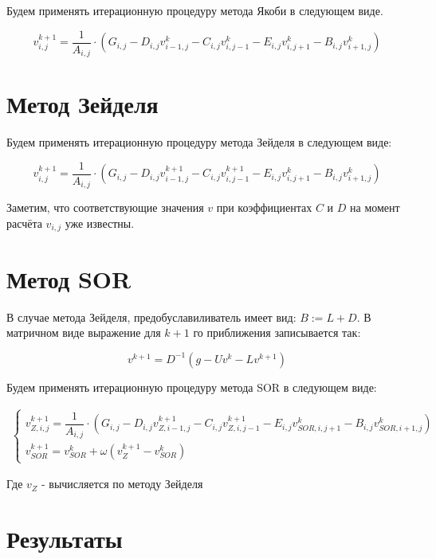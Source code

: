 \documentclass[12pt]{article}
\begin{document}
Будем применять итерационную процедуру метода Якоби в следующем виде.

\begin{equation}
v_{i,j}^{k+1} = \dfrac{1}{A_{i,j}} \cdot (G_{i,j} - D_{i,j}v_{i-1,j}^{k} - C_{i,j}v_{i,j-1}^{k} - E_{i,j}v_{i,j+1}^{k} - B_{i,j}v_{i+1,j}^{k})
\end{equation}

\section{Метод Зейделя}

Будем применять итерационную процедуру метода Зейделя в следующем виде:

\begin{equation}
v_{i,j}^{k+1} = \dfrac{1}{A_{i,j}} \cdot (G_{i,j} - D_{i,j}v_{i-1,j}^{k+1} - C_{i,j}v_{i,j-1}^{k+1} - E_{i,j}v_{i,j+1}^{k} - B_{i,j}v_{i+1,j}^{k})
\end{equation}

Заметим, что соответствующие значения $v$ при коэффициентах $C$ и $D$ на момент расчёта $v_{i,j}$ уже известны.

\section{Метод SOR}

В случае метода Зейделя, предобуславиливатель имеет вид: $B := L + D$. В матричном виде выражение для $k+1$ го приближения записывается так:

\begin{equation}
v^{k+1} = D^{-1}(g - Uv^k - Lv^{k+1})
\end{equation}

Будем применять итерационную процедуру метода SOR в следующем виде:

\begin{eqnarray}
\begin{cases}
v_{Z, i, j}^{k+1} = \dfrac{1}{A_{i,j}} \cdot (G_{i,j} - D_{i,j}v_{Z,i-1,j}^{k+1} - C_{i,j}v_{Z, i,j-1}^{k+1} - E_{i,j}v_{SOR,i,j+1}^{k} - B_{i,j}v_{SOR,i+1,j}^{k}) \\
v_{SOR}^{k+1} = v_{SOR}^{k} + \omega (v_{Z}^{k+1} - v_{SOR}^{k}) 
\end{cases}
\end{eqnarray}

Где $v_{Z}$ - вычисляется по методу Зейделя

\section{Результаты}
\end{document}
